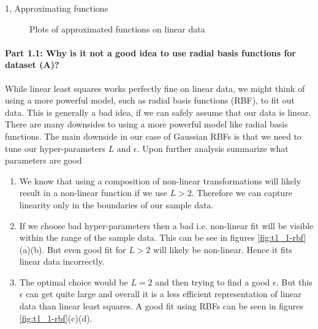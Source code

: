 \begin{task}{1, Approximating functions}
\begin{figure}[H]
\centering
{}
\caption{Plots of approximated functions on linear data}
\label{fig:t1_1}
\end{figure}

\paragraph{Part 1.1: Why is it not a good idea to use radial basis functions for dataset (A)?}
While linear least squares works perfectly fine on linear data, we might think of using a more powerful model, such as radial basis functions (RBF), to fit out data. This is generally a bad idea, if we can safely assume that our data is linear. There are many downsides to using a more powerful model like radial basis functions. The main downside in our case of Gaussian RBFs
is that we need to tune our hyper-parameters $L$ and $\epsilon$. Upon further analysis summarize what parameters are good

\begin{enumerate}
    \item We know that using a composition of non-linear transformations will likely result in a non-linear function if we use $L>2$. Therefore we can capture linearity only in the boundaries of our sample data.
    \item If we choose bad hyper-parameters then a bad i.e. non-linear fit will be visible within the range of the sample data. This can be see in figures \ref{fig:t1_1-rbf}(a)(b). But even good fit for $L>2$ will likely be non-linear. Hence it fits linear data incorrectly.
    \item The optimal choice would be $L=2$ and then trying to find a good $\epsilon$. But this $\epsilon$ can get quite large and overall it is a less efficient representation of linear data than linear least squares. A good fit using RBFs can be seen in figures \ref{fig:t1_1-rbf}(c)(d).
\end{enumerate}


\end{task}
